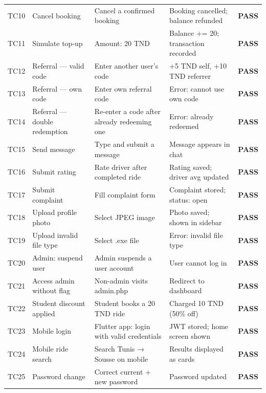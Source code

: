 \documentclass[12pt,a4paper,openright]{report}
\begin{document}
\begin{longtable}{p{0.8cm} p{3.5cm} p{4cm} p{3cm} c}
TC10 & Cancel booking & Cancel a confirmed booking & Booking cancelled; balance refunded & \textcolor{green!70!black}{\textbf{PASS}} \\
TC11 & Simulate top-up & Amount: 20 TND & Balance += 20; transaction recorded & \textcolor{green!70!black}{\textbf{PASS}} \\
TC12 & Referral — valid code & Enter another user's code & +5 TND self, +10 TND referrer & \textcolor{green!70!black}{\textbf{PASS}} \\
TC13 & Referral — own code & Enter own referral code & Error: cannot use own code & \textcolor{green!70!black}{\textbf{PASS}} \\
TC14 & Referral — double redemption & Re-enter a code after already redeeming one & Error: already redeemed & \textcolor{green!70!black}{\textbf{PASS}} \\
TC15 & Send message & Type and submit a message & Message appears in chat & \textcolor{green!70!black}{\textbf{PASS}} \\
TC16 & Submit rating & Rate driver after completed ride & Rating saved; driver avg updated & \textcolor{green!70!black}{\textbf{PASS}} \\
TC17 & Submit complaint & Fill complaint form & Complaint stored; status: open & \textcolor{green!70!black}{\textbf{PASS}} \\
TC18 & Upload profile photo & Select JPEG image & Photo saved; shown in sidebar & \textcolor{green!70!black}{\textbf{PASS}} \\
TC19 & Upload invalid file type & Select .exe file & Error: invalid file type & \textcolor{green!70!black}{\textbf{PASS}} \\
TC20 & Admin: suspend user & Admin suspends a user account & User cannot log in & \textcolor{green!70!black}{\textbf{PASS}} \\
TC21 & Access admin without flag & Non-admin visits admin.php & Redirect to dashboard & \textcolor{green!70!black}{\textbf{PASS}} \\
TC22 & Student discount applied & Student books a 20 TND ride & Charged 10 TND (50\% off) & \textcolor{green!70!black}{\textbf{PASS}} \\
TC23 & Mobile login & Flutter app: login with valid credentials & JWT stored; home screen shown & \textcolor{green!70!black}{\textbf{PASS}} \\
TC24 & Mobile ride search & Search Tunis → Sousse on mobile & Results displayed as cards & \textcolor{green!70!black}{\textbf{PASS}} \\
TC25 & Password change & Correct current + new password & Password updated & \textcolor{green!70!black}{\textbf{PASS}} \\
\end{longtable}
\end{document}
